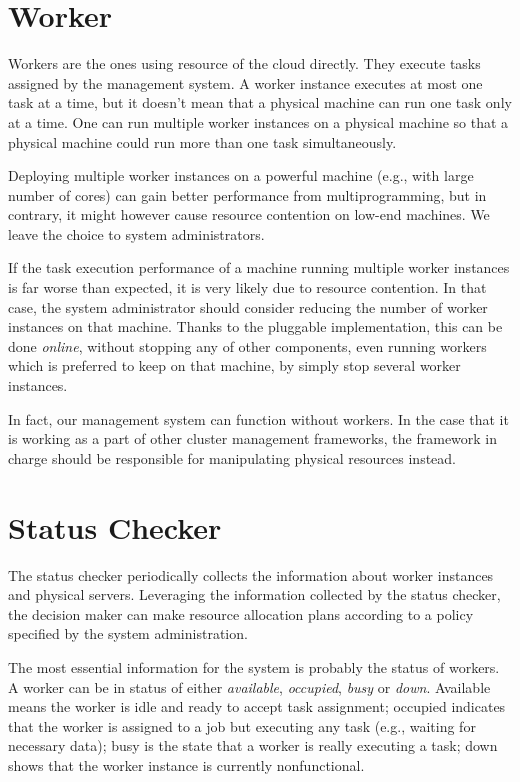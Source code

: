 \section{Worker}

Workers are the ones using resource of the cloud directly.  They execute
tasks assigned by the management system.  A worker instance executes at
most one task at a time, but it doesn't mean that a physical machine can
run one task only at a time.  One can run multiple worker instances on a
physical machine so that a physical machine could run more than one task
simultaneously.	 

Deploying multiple worker instances on a powerful machine (e.g., with
large number of cores) can gain better performance from
multiprogramming, but in contrary, it might however cause resource
contention on low-end machines.  We leave the choice to system
administrators.  

If the task execution performance of a machine running multiple worker
instances is far worse than expected, it is very likely due to resource
contention.  In that case, the system administrator should consider
reducing the number of worker instances on that machine.  Thanks to the
pluggable implementation, this can be done \emph{online}, without
stopping any of other components, even running workers which is
preferred to keep on that machine, by simply stop several worker
instances.

In fact, our management system can function without workers.  In the
case that it is working as a part of other cluster management
frameworks, the framework in charge should be responsible for
manipulating physical resources instead.

\section{Status Checker}

The status checker periodically collects the information about worker
instances and physical servers.  Leveraging the information collected
by the status checker, the decision maker can make resource allocation
plans according to a policy specified by the system administration.

The most essential information for the system is probably the status of
workers.  A worker can be in status of either \emph{available},
\emph{occupied}, \emph{busy} or \emph{down}.  Available means the worker
is idle and ready to accept task assignment; occupied indicates that the
worker is assigned to a job but executing any task (e.g., waiting for
necessary data); busy is the state that a worker is really executing a
task; down shows that the worker instance is currently nonfunctional. 

